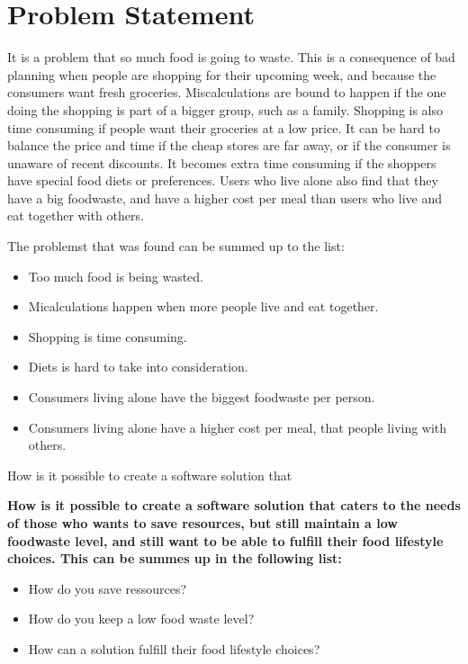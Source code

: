 \chapter{Problem Statement}
It is a problem that so much food is going to waste.
This is a consequence of bad planning when people are shopping for their upcoming week, and because the consumers want fresh groceries.
Miscalculations are bound to happen if the one doing the shopping is part of a bigger group, such as a family.
Shopping is also time consuming if people want their groceries at a low price.
It can be hard to balance the price and time if the cheap stores are far away, or if the consumer is unaware of recent discounts.
It becomes extra time consuming if the shoppers have special food diets or preferences.
Users who live alone also find that they have a big foodwaste, and have a higher cost per meal than users who live and eat together with others.

The problemst that was found can be summed up to the list:

\begin{itemize}
    \item Too much food is being wasted.
    \item Micalculations happen when more people live and eat together.
    \item Shopping is time consuming.
    \item Diets is hard to take into consideration.
    \item Consumers living alone have the biggest foodwaste per person.
    \item Consumers living alone have a higher cost per meal, that people living with others.
\end{itemize}

How is it possible to create a software solution that

\textbf{How is it possible to create a software solution that caters to the needs of those who wants to save resources, but still maintain a low foodwaste level, and still want to be able to fulfill their food lifestyle choices. This can be summes up in the following list:}

\begin{itemize}
	\item How do you save ressources?
	\item How do you keep a low food waste level?
	\item How can a solution fulfill their food lifestyle choices?
\end{itemize}


